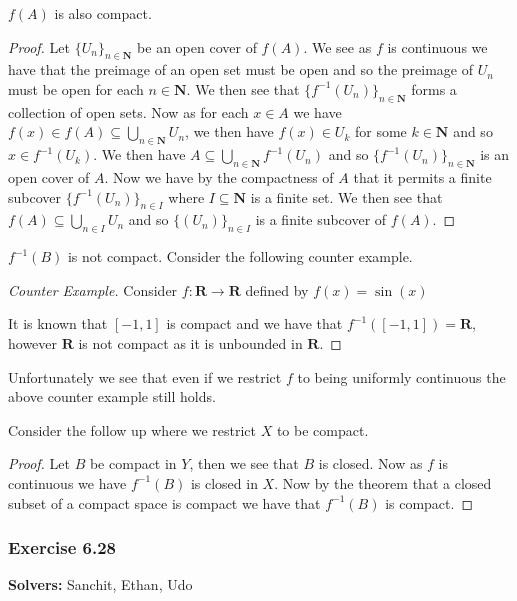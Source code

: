 \documentclass{article}
\newcommand{\N}{\mathbf{N}}
\newcommand{\R}{\mathbf{R}}
\theoremstyle{plain} %
\numberwithin{thm}{section} %
\theoremstyle{definition}
\begin{document}
    \bigskip

    $f(A)$ is also compact.
    \begin{proof}
        Let $\{U_n\}_{n \in \N}$ be an open cover of $f(A)$. We see as $f$ is continuous we have that the preimage of an open set must be open and so the preimage of $U_n$ must be open for each $n \in \N$. We then see that $\{f^{-1}(U_n)\}_{n \in \N}$ forms a collection of open sets. Now as for each $x \in A$ we have $f(x) \in f(A) \subseteq \bigcup\limits_{n \in \N} U_n$, we then have $f(x) \in U_k$ for some $k \in \N$ and so $x \in f^{-1} (U_k)$. We then have $A \subseteq \bigcup\limits_{n \in \N} f^{-1}(U_n)$ and so $\{f^{-1}(U_n)\}_{n \in \N}$ is an open cover of $A$. Now we have by the compactness of $A$ that it permits a finite subcover $\{f^{-1}(U_n)\}_{n \in I}$ where $I \subseteq \N$ is a finite set. We then see that $f(A) \subseteq \bigcup\limits_{n \in I} U_n$ and so $\{(U_n)\}_{n \in I}$ is a finite subcover of $f(A)$.
    \end{proof}

    $f^{-1}(B)$ is not compact. Consider the following counter example.
    \begin{proof}[Counter Example]
        Consider $f: \R \to \R$ defined by $f(x) = \sin (x)$

        It is known that $[-1, 1]$ is compact and we have that $f^{-1}([-1,1]) = \R$, however $\R$ is not compact as it is unbounded in $\R$.
    \end{proof}

    Unfortunately we see that even if we restrict $f$ to being uniformly continuous the above counter example still holds.

    \bigskip

    Consider the follow up where we restrict $X$ to be compact.

    \begin{proof}
        Let $B$ be compact in $Y$, then we see that $B$ is closed. Now as $f$ is continuous we have $f^{-1}(B)$ is closed in $X$. Now by the theorem that a closed subset of a compact space is compact we have that $f^{-1}(B)$ is compact.
    \end{proof}

    \subsubsection{Exercise 6.28}
    
    \textbf{Solvers:} Sanchit, Ethan, Udo
\end{document}

